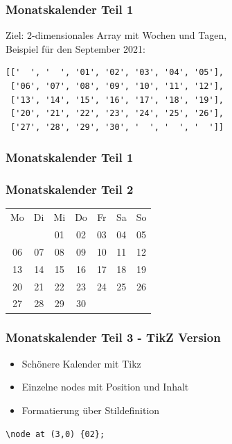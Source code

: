 \documentclass[12pt,ngerman]{beamer}
\begin{document}
\begin{frame}[containsverbatim]
\frametitle{Monatskalender Teil 1}

Ziel: 2-dimensionales Array mit Wochen und Tagen, \\ Beispiel für den September 2021:

\begin{verbatim}
[['  ', '  ', '01', '02', '03', '04', '05'],
 ['06', '07', '08', '09', '10', '11', '12'],
 ['13', '14', '15', '16', '17', '18', '19'],
 ['20', '21', '22', '23', '24', '25', '26'],
 ['27', '28', '29', '30', '  ', '  ', '  ']]
\end{verbatim}
\end{frame}

\begin{frame}[containsverbatim]
\frametitle{Monatskalender Teil 1}

\scalebox{0.96}{%
}

\end{frame}

\begin{frame}[containsverbatim]
\frametitle{Monatskalender Teil 2}

\scalebox{1.2}{%
}\vspace*{1em}

\begin{tabular}{ccccccc}
Mo & Di & Mi & Do & Fr & Sa & So \\
   &    & 01 & 02 & 03 & 04 & 05 \\
06 & 07 & 08 & 09 & 10 & 11 & 12 \\
13 & 14 & 15 & 16 & 17 & 18 & 19 \\
20 & 21 & 22 & 23 & 24 & 25 & 26 \\
27 & 28 & 29 & 30 &    &    &    \\
\end{tabular}


\end{frame}

\begin{frame}[containsverbatim]
\frametitle{Monatskalender Teil 3 - TikZ Version}

\begin{itemize}
	\item Schönere Kalender mit Tikz
	\item Einzelne nodes mit Position und Inhalt
	\item Formatierung über Stildefinition
\end{itemize}

\begin{lstlisting}[basicstyle=\ttfamily\normalsize]
\node at (3,0) {02}; 
\end{lstlisting}

\scalebox{0.96}{%
}


\end{frame}
\end{document}
